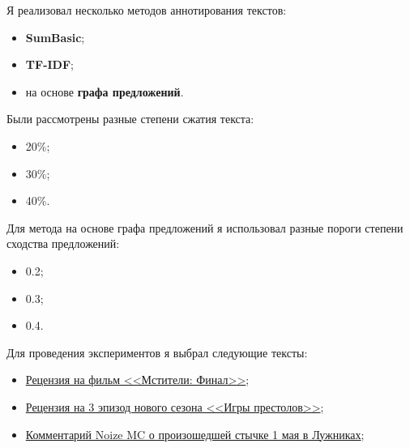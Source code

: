 \documentclass[oneside,final,12pt]{article}
\begin{document}
Я реализовал несколько методов аннотирования текстов:
\begin{itemize}
	\item \textbf{SumBasic};
	\item \textbf{TF-IDF};
	\item на основе \textbf{графа предложений}.
\end{itemize}

Были рассмотрены разные степени сжатия текста:
\begin{multicols}{3}
	\begin{itemize}
		\item 20\%;
	\end{itemize}
	\begin{itemize}
		\item 30\%;
	\end{itemize}
	\begin{itemize}
		\item 40\%.
	\end{itemize}
\end{multicols}

Для метода на основе графа предложений я использовал разные пороги степени сходства предложений:
\begin{multicols}{3}
	\begin{itemize}
		\item 0.2;
	\end{itemize}
	\begin{itemize}
		\item 0.3;
	\end{itemize}
	\begin{itemize}
		\item 0.4.
	\end{itemize}
\end{multicols}

Для проведения экспериментов я выбрал следующие тексты:
\begin{itemize}
	\item \href{https://the-flow.ru/features/mstiteli-final-review}{Рецензия на фильм <<Мстители: Финал>>};
	\item \href{https://the-flow.ru/features/novyy-epizod-igry-prestolov-pochemu-on-razocharoval}{Рецензия на 3 эпизод нового сезона <<Игры престолов>>};
	\item \href{https://the-flow.ru/news/na-rep-festivale-v-moskve-policiya-i-rosgvardiya-izbila-shkolnikov}{Комментарий Noize MC о произошедшей стычке 1 мая в Лужниках};
\end{itemize}
\end{document}
